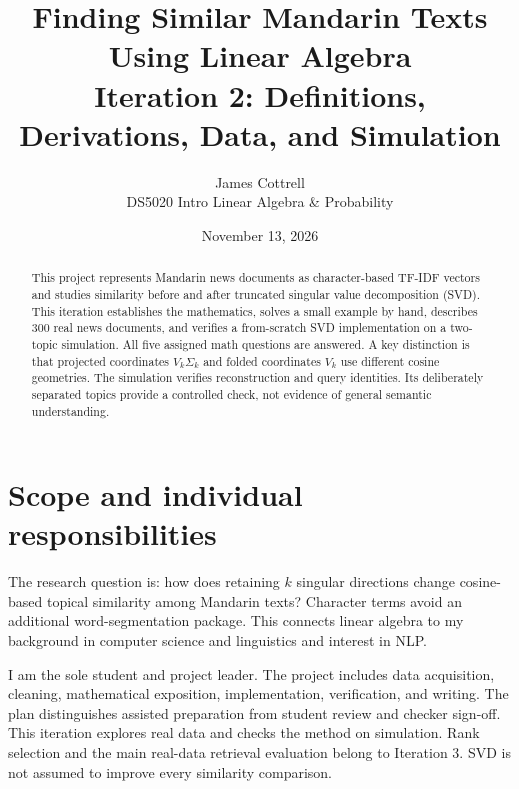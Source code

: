 \documentclass[11pt]{article}
\title{Finding Similar Mandarin Texts\\Using Linear Algebra\\[5pt]
\large Iteration 2: Definitions, Derivations, Data, and Simulation}
\author{James Cottrell\\DS5020 Intro Linear Algebra \& Probability}
\date{November 13, 2026}
\begin{document}
\maketitle
\begin{abstract}
This project represents Mandarin news documents as character-based TF-IDF vectors
and studies similarity before and after truncated singular value decomposition
(SVD). This iteration establishes the mathematics, solves a small example by hand,
describes 300 real news documents, and verifies a from-scratch SVD implementation
on a two-topic simulation. All five assigned math questions are answered. A key
distinction is that projected coordinates $V_k\Sigma_k$ and folded coordinates
$V_k$ use different cosine geometries. The simulation verifies reconstruction and
query identities. Its deliberately separated topics provide a controlled check,
not evidence of general semantic understanding.
\end{abstract}

\section{Scope and individual responsibilities}
The research question is: how does retaining $k$ singular directions change
cosine-based topical similarity among Mandarin texts? Character terms avoid an
additional word-segmentation package. This connects linear algebra to my background
in computer science and linguistics and interest in NLP.

I am the sole student and project leader. The project includes data acquisition,
cleaning, mathematical exposition, implementation, verification, and writing.
The plan distinguishes assisted preparation from student review and checker
sign-off. This iteration explores real data and checks the method on simulation.
Rank selection and the main real-data retrieval evaluation belong to Iteration 3.
SVD is not assumed to improve every similarity comparison.
\end{document}
